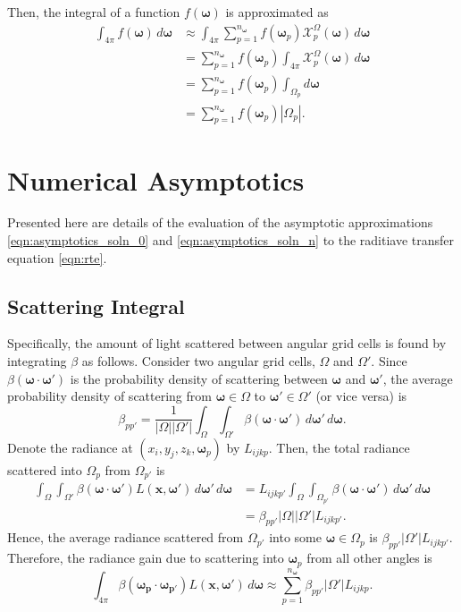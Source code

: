 \documentclass[ms,cpyr,lof,lot]{uathesis}
\newcommand\abs[1]{\left| #1 \right|}
\renewcommand\vec\bm
\newcommand\nomega{{n_{\vec{\omega}}}}
\begin{document}
Then, the integral of a function $f(\vec{\omega})$ is approximated as
\begin{align*}
  \int_{4\pi} f(\vec{\omega})\, d\vec{\omega} &\approx \int_{4\pi} \sum_{p=1}^\nomega f(\vec{\omega}_p) \mathcal{X}^\Omega_p(\vec{\omega})\, d\vec{\omega} \\
  &= \sum_{p=1}^\nomega f(\vec{\omega}_p) \int_{4\pi} \mathcal{X}^\Omega_p(\vec{\omega})\, d\vec{\omega} \\
  &= \sum_{p=1}^\nomega f(\vec{\omega}_p) \int_{\Omega_p} d\vec{\omega} \\
  &= \sum_{p=1}^\nomega f(\vec{\omega}_p) \abs{\Omega_p}.
\end{align*}

\section{Numerical Asymptotics}
Presented here are details of the evaluation of the asymptotic approximations \eqref{eqn:asymptotics_soln_0} and \eqref{eqn:asymptotics_soln_n} to the raditiave transfer equation \eqref{eqn:rte}.

\subsection{Scattering Integral}

Specifically, the amount of light scattered between angular grid cells is found by integrating $\beta$ as follows.
Consider two angular grid cells, $\Omega$ and $\Omega'$.
Since $\beta(\vec{\omega}\cdot\vec{\omega}')$ is the probability density of scattering between $\vec{\omega}$ and $\vec{\omega}'$, the average probability density of scattering from $\vec{\omega} \in \Omega$ to $\vec{\omega}' \in \Omega'$ (or vice versa) is
\begin{equation*}
  \beta_{pp'} = \frac{1}{\abs{\Omega}\abs{\Omega'}} \int_\Omega\int_{\Omega'}\beta(\vec{\omega}\cdot\vec{\omega}')\, d\vec{\omega'}\, d\vec{\omega}.
\end{equation*}
Denote the radiance at $(x_i, y_j, z_k, \vec{\omega}_p)$ by $L_{ijkp}$.
Then, the total radiance scattered into $\Omega_p$ from $\Omega_{p'}$ is
\begin{align*}
  \int_{\Omega}\int_{\Omega'}\beta(\vec{\omega} \cdot \vec{\omega}')L(\vec{x},\vec{\omega}')\, d\vec{\omega}'\, d\vec{\omega}
  &= L_{ijkp'} \int_\Omega\int_{\Omega_{p'}} \beta(\vec{\omega} \cdot \vec{\omega}')\, d\vec{\omega}'\, d\vec{\omega} \\
  &= \beta_{pp'}\abs{\Omega}\abs{\Omega'}L_{ijkp'}.
\end{align*}
Hence, the average radiance scattered from $\Omega_{p'}$ into some $\vec{\omega} \in \Omega_p$ is $\beta_{pp'}\abs{\Omega'}L_{ijkp'}$.
Therefore, the radiance gain due to scattering into $\vec{\omega}_p$ from all other angles is
\begin{equation}
  \int_{4\pi}\beta(\vec{\omega_p}\cdot\vec{\omega_{p'}})L(\vec{x}, \vec{\omega}')\, d\vec{\omega} \approx \sum_{p=1}^\nomega \beta_{pp'}\abs{\Omega'}L_{ijkp}.
  \label{eqn:scatter_integral}
\end{equation}
\end{document}
